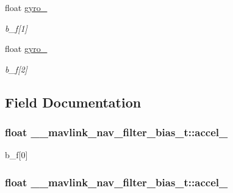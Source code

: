 \begin{DoxyCompactItemize}
float \hyperlink{struct____mavlink__nav__filter__bias__t_a1b4f774f6b5b7761ea4a82b71d669841}{gyro\+\_}
\begin{DoxyCompactList}\small\item\em b\+\_\+f\mbox{[}1\mbox{]} \end{DoxyCompactList}\item 
float \hyperlink{struct____mavlink__nav__filter__bias__t_ab0f72a3646d3b2d3e3406ef09daed319}{gyro\+\_}
\begin{DoxyCompactList}\small\item\em b\+\_\+f\mbox{[}2\mbox{]} \end{DoxyCompactList}\end{DoxyCompactItemize}


\subsection{Field Documentation}
\hypertarget{struct____mavlink__nav__filter__bias__t_a6800931fe80e11e28fd7cd375cf20301}{
\subsubsection[{accel\+\_\+0}]{\setlength{\rightskip}{0pt plus 5cm}float \+\_\+\+\_\+mavlink\+\_\+nav\+\_\+filter\+\_\+bias\+\_\+t\+::accel\+\_}}\label{struct____mavlink__nav__filter__bias__t_a6800931fe80e11e28fd7cd375cf20301}


b\+\_\+f\mbox{[}0\mbox{]} 

\hypertarget{struct____mavlink__nav__filter__bias__t_ac6c566a96fcf139842704d16c2e846c2}{
\subsubsection[{accel\+\_\+1}]{\setlength{\rightskip}{0pt plus 5cm}float \+\_\+\+\_\+mavlink\+\_\+nav\+\_\+filter\+\_\+bias\+\_\+t\+::accel\+\_}}\label{struct____mavlink__nav__filter__bias__t_ac6c566a96fcf139842704d16c2e846c2}


